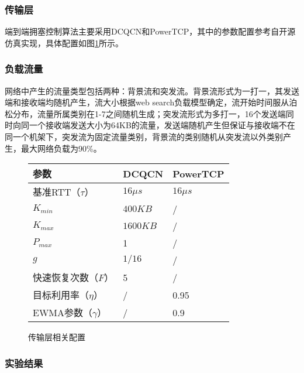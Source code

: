 \subsubsection{传输层}

端到端拥塞控制算法主要采用DCQCN\cite{SIGCOMM15DCQCN}和PowerTCP\cite{NSDI22PowerTCP}，其中的参数配置参考自开源仿真实现\cite{HPCCGitHub}，具体配置如图\ref{fig:c3:parameter setting in transport protocol}所示。

\subsubsection{负载流量}

网络中产生的流量类型包括两种：背景流和突发流。背景流形式为一打一，其发送端和接收端均随机产生，流大小根据web search\cite{SIGCOMM10DCTCP}负载模型确定，流开始时间服从泊松分布，流量所属类别在1-7之间随机生成；突发流形式为多打一，16个发送端同时向同一个接收端发送大小为64KB的流量，发送端随机产生但保证与接收端不在同一个机架下，突发流为固定流量类别，背景流的类别随机从突发流以外类别产生，最大网络负载为90\%。

\begin{figure}[H]
  \begin{table}[H]
      \begin{tabularx}{\textwidth}{YYY}
      \toprule
          \textbf{参数} & \textbf{DCQCN} & \textbf{PowerTCP}\\
      \midrule
          基准RTT（$\tau$） & $16\mu s$ & $16\mu s$ \\
          $K_{min}$ & $400KB$ & / \\
          $K_{max}$ & $1600KB$ & / \\
          $P_{max}$ & 1 & / \\
          $g$ & $1/16$ & / \\
          快速恢复次数（$F$） & 5 & / \\
          目标利用率（$\eta$） & / & 0.95 \\
          EWMA参数（$\gamma$） & / & 0.9 \\
      \bottomrule
      \end{tabularx}
  \end{table}
  \caption{传输层相关配置}
  \label{fig:c3:parameter setting in transport protocol}
\end{figure}

\subsubsection{实验结果}

